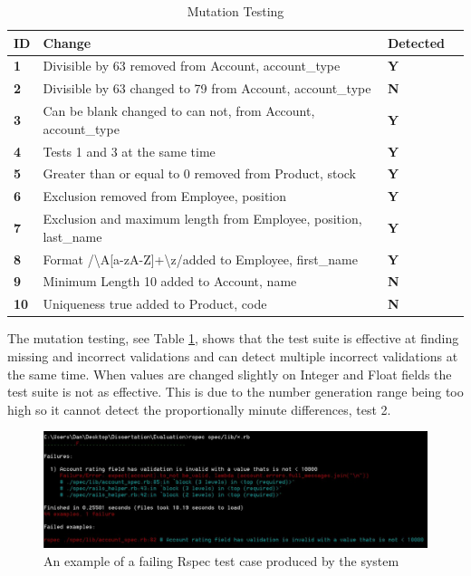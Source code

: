 \documentclass[a4paper,12pt]{article}
\begin{document}
\begin{table}
\centering
\caption{Mutation Testing}
\label{test:1}
\begin{tabularx}{\textwidth}{|l|X|l|l|}
\hline
\textbf{ID} & \textbf{Change}                                          & \textbf{Detected} \\ \hline
\textbf{1}  & Divisible by 63 removed from Account, account\_type                       & \textbf{Y}\\ \hline
\textbf{2}  & Divisible by 63 changed to 79 from Account, account\_type                       & \textbf{N}\\ \hline
\textbf{3}  & Can be blank changed to can not, from Account, account\_type                       & \textbf{Y}\\ \hline
\textbf{4}  & Tests 1 and 3 at the same time                       & \textbf{Y}\\ \hline
\textbf{5}  & Greater than or equal to 0 removed from Product, stock & \textbf{Y}     \\ \hline
\textbf{6}  & Exclusion removed from Employee, position                 & \textbf{Y}   \\ \hline
\textbf{7}  & Exclusion and maximum length from Employee, position, last\_name               & \textbf{Y}     \\ \hline
\textbf{8}  & Format /{\textbackslash}A[a-zA-Z]+{\textbackslash}z/added to Employee, first\_name              & \textbf{Y}       \\ \hline
\textbf{9}  & Minimum Length 10 added to  Account, name             & \textbf{N}       \\ \hline
\textbf{10}  & Uniqueness true  added to  Product, code             & \textbf{N}       \\ \hline
\end{tabularx}
\end{table}
\par The mutation testing, see Table \ref{test:1}, shows that the test suite is effective at finding missing and incorrect validations and can detect multiple incorrect validations at the same time. When values are changed slightly on Integer and Float fields the test suite is not as effective. This is due to the number generation range being too high so it cannot detect the proportionally minute differences, test 2.
\begin{figure}
\includegraphics[width=\linewidth]{screenshots/rspecfail}
\caption{An example of a failing Rspec test case produced by the system}
\label{fig:rspecfail}
\end{figure}
\end{document}
